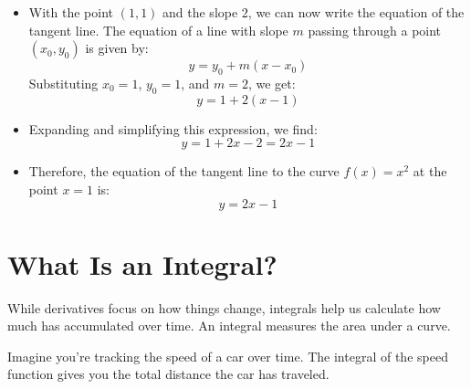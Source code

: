 \begin{enumerate}
\begin{itemize}
        \item With the point \( (1, 1) \) and the slope \( 2 \), we can now write the equation of the tangent line. The equation of a line with slope \( m \) passing through a point \( (x_0, y_0) \) is given by:
        \[
        y = y_0 + m(x - x_0)
        \]
        Substituting \( x_0 = 1 \), \( y_0 = 1 \), and \( m = 2 \), we get:
        \[
        y = 1 + 2(x - 1)
        \]
    
        \item Expanding and simplifying this expression, we find:
        \[
        y = 1 + 2x - 2 = 2x - 1
        \]
        
        \item Therefore, the equation of the tangent line to the curve \( f(x) = x^2 \) at the point \( x = 1 \) is:
        \[
        y = 2x - 1
        \]
    \end{itemize}
    

    \begin{center}
    \end{center}
\end{enumerate}


\section{What Is an Integral?}
While derivatives focus on how things change, integrals help us calculate how much has accumulated over time. An integral measures the area under a curve.

Imagine you’re tracking the speed of a car over time. The integral of the speed function gives you the total distance the car has traveled.

